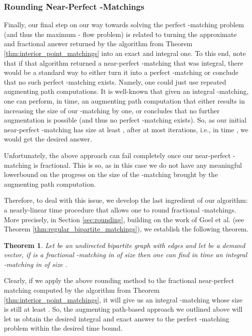 \documentclass[11pt, letterpaper]{article}
\newtheorem{theorem}{Theorem}[section]
\begin{document}
\subsubsection*{Rounding Near-Perfect -Matchings}

Finally, our final step on our way towards solving the perfect -matching problem (and thus the maximum - flow problem) is related to turning the approximate and fractional answer returned by the algorithm from Theorem \ref{thm:interior_point_matchings} into an exact and integral one. To this end, note that if that algorithm returned a near-perfect -matching that was integral, there would be a standard way to either turn it into a perfect -matching or conclude that no such perfect -matching exists. Namely, one could just use repeated augmenting path computations. It is well-known that given an integral -matching, one can perform,  in  time, an augmenting path computation that either results in increasing the size of our -matching by one, or concludes that no further augmentation is possible (and thus no perfect -matching exists). So, as our initial near-perfect -matching has size at least , after at most  iterations, i.e., in time , we would get the desired answer. 

Unfortunately, the above approach can fail completely once our near-perfect -matching is fractional. This is so, as in this case we do not have any meaningful lowerbound on the progress on the size of the -matching brought by the augmenting path computation. 

Therefore, to deal with this issue, we develop the last ingredient of our algorithm: a nearly-linear time procedure that allows one to round fractional -matchings.  More precisely, in Section \ref{sec:rounding}, building on the work of Goel et al. \cite{GoelKK10} (see Theorem \ref{thm:regular_bipartite_matchings}), we establish the following theorem.

\begin{theorem}\label{thm:rounding_matchings}
Let  be an undirected bipartite graph with  edges and let  be a demand vector, if  is a fractional -matching in  of size  then one can find in  time an integral -matching in  of size .
\end{theorem}

Clearly, if we apply the above rounding method to the fractional near-perfect matching  computed by the algorithm from Theorem \ref{thm:interior_point_matchings}, it will give us an integral -matching  whose size is still at least . So, the augmenting path-based approach we outlined above will let us obtain the desired integral and exact answer to the perfect -matching problem within the desired time bound. 
\end{document}
